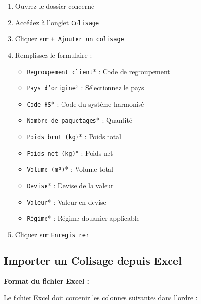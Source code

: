 \documentclass[12pt,a4paper]{report}
\begin{document}
\begin{enumerate}[leftmargin=*]
    \item Ouvrez le dossier concerné
    \item Accédez à l'onglet \texttt{Colisage}
    \item Cliquez sur \texttt{+ Ajouter un colisage}
    \item Remplissez le formulaire :
    \begin{itemize}
        \item \texttt{Regroupement client}* : Code de regroupement
        \item \texttt{Pays d'origine}* : Sélectionnez le pays
        \item \texttt{Code HS}* : Code du système harmonisé
        \item \texttt{Nombre de paquetages}* : Quantité
        \item \texttt{Poids brut (kg)}* : Poids total
        \item \texttt{Poids net (kg)}* : Poids net
        \item \texttt{Volume (m³)}* : Volume total
        \item \texttt{Devise}* : Devise de la valeur
        \item \texttt{Valeur}* : Valeur en devise
        \item \texttt{Régime}* : Régime douanier applicable
    \end{itemize}
    \item Cliquez sur \texttt{Enregistrer}
\end{enumerate}

\subsection{Importer un Colisage depuis Excel}

\textbf{Format du fichier Excel :}

Le fichier Excel doit contenir les colonnes suivantes dans l'ordre :
\end{document}
